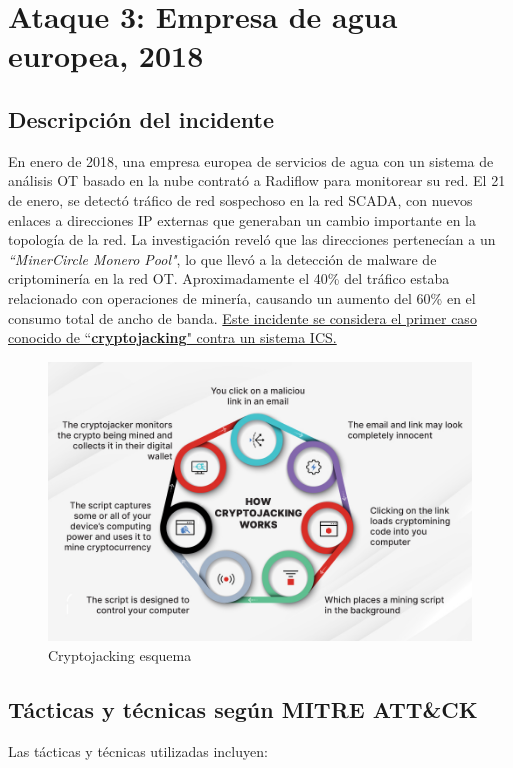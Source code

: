 \section{Ataque 3: Empresa de agua europea, 2018}

\subsection{Descripción del incidente}
En enero de 2018, una empresa europea de servicios de agua con un sistema de análisis \textsc{OT} basado en la nube contrató a Radiflow para monitorear su red. El 21 de enero, se detectó tráfico de red sospechoso en la red \textsc{SCADA}, con nuevos enlaces a direcciones IP externas que generaban un cambio importante en la topología de la red. La investigación reveló que las direcciones pertenecían a un \textit{``MinerCircle Monero Pool"}, lo que llevó a la detección de malware de criptominería en la red \textsc{OT}. Aproximadamente el 40\% del tráfico estaba relacionado con operaciones de minería, causando un aumento del 60\% en el consumo total de ancho de banda. \ul{Este incidente se considera el primer caso conocido de ``\textbf{cryptojacking}" contra un sistema ICS.}

\begin{figure}[htbp]
    \centering
    \includegraphics[width=0.85\columnwidth]{images/cryptojacking.jpg}
    \caption{Cryptojacking esquema}
    \label{fig:cryptojacking}
\end{figure}

\subsection{Tácticas y técnicas según MITRE ATT\&CK}
Las tácticas y técnicas utilizadas incluyen:


